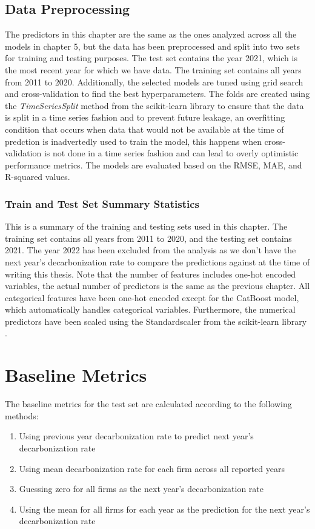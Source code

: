 \subsection{Data Preprocessing}
The predictors in this chapter are the same as the ones analyzed across all the models in chapter 5, but the data has been preprocessed and split into two sets for training and testing purposes. The test set contains the year 2021, which is the most recent year for which we have data. The training set contains all years from 2011 to 2020. Additionally, the selected models are tuned using grid search and cross-validation to find the best hyperparameters. The folds are created using the \textit{TimeSeriesSplit} method from the scikit-learn library \cite{scikit-learn} to ensure that the data is split in a time series fashion and to prevent future leakage, an overfitting condition that occurs when data that would not be available at the time of predction is inadvertedly used to train the model, this happens when cross-validation is not done in a time series fashion and can lead to overly optimistic performance metrics. The models are evaluated based on the RMSE, MAE, and R-squared values. 

\subsubsection{Train and Test Set Summary Statistics}
This is a summary of the training and testing sets used in this chapter. The training set contains all years from 2011 to 2020, and the testing set contains 2021. The year 2022 has been excluded from the analysis as we don't have the next year's decarbonization rate to compare the predictions against at the time of writing this thesis. Note that the number of features includes one-hot encoded variables, the actual number of predictors is the same as the previous chapter. All categorical features have been one-hot encoded except for the CatBoost model, which automatically handles categorical variables. Furthermore, the numerical predictors have been scaled using the Standardscaler from the scikit-learn library \cite{scikit-learn}.



\section{Baseline Metrics}
The baseline metrics for the test set are calculated according to the following methods:
\begin{enumerate}
    \item Using previous year decarbonization rate to predict next year's decarbonization rate
    \item Using mean decarbonization rate for each firm across all reported years
    \item Guessing zero for all firms as the next year's decarbonization rate
    \item Using the mean for all firms for each year as the prediction for the next year's decarbonization rate
\end{enumerate}

